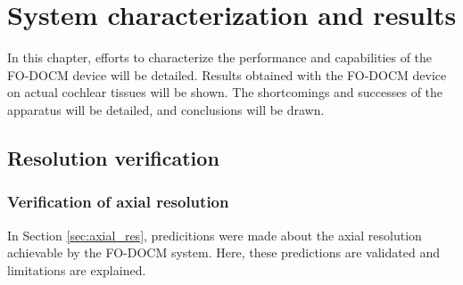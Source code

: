 \chapter{System characterization and results}

In this chapter, efforts to characterize the performance and capabilities of the FO-DOCM device will be detailed. Results obtained with the FO-DOCM device on actual cochlear tissues will be shown. The shortcomings and successes of the apparatus will be detailed, and conclusions will be drawn.

\section{Resolution verification}

\subsection{Verification of axial resolution}

In Section \ref{sec:axial_res}, predicitions were made about the axial resolution achievable by the FO-DOCM system. Here, these predictions are validated and limitations are explained.






